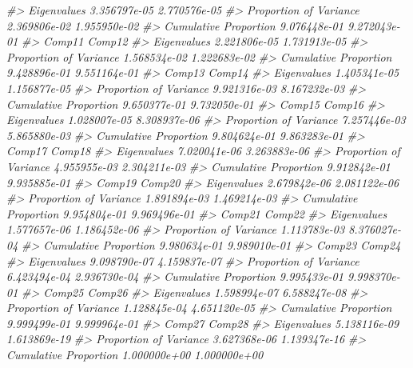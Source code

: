 \documentclass[
]{book}
\newenvironment{Shaded}{\begin{snugshade}}{\end{snugshade}}
\newcommand{\CommentTok}[1]{\textcolor[rgb]{0.56,0.35,0.01}{\textit{#1}}}
\begin{document}
\begin{Shaded}
\begin{Highlighting}[]
\CommentTok{\#\textgreater{} Eigenvalues            3.356797e{-}05 2.770576e{-}05}
\CommentTok{\#\textgreater{} Proportion of Variance 2.369806e{-}02 1.955950e{-}02}
\CommentTok{\#\textgreater{} Cumulative Proportion  9.076448e{-}01 9.272043e{-}01}
\CommentTok{\#\textgreater{}                              Comp11       Comp12}
\CommentTok{\#\textgreater{} Eigenvalues            2.221806e{-}05 1.731913e{-}05}
\CommentTok{\#\textgreater{} Proportion of Variance 1.568534e{-}02 1.222683e{-}02}
\CommentTok{\#\textgreater{} Cumulative Proportion  9.428896e{-}01 9.551164e{-}01}
\CommentTok{\#\textgreater{}                              Comp13       Comp14}
\CommentTok{\#\textgreater{} Eigenvalues            1.405341e{-}05 1.156877e{-}05}
\CommentTok{\#\textgreater{} Proportion of Variance 9.921316e{-}03 8.167232e{-}03}
\CommentTok{\#\textgreater{} Cumulative Proportion  9.650377e{-}01 9.732050e{-}01}
\CommentTok{\#\textgreater{}                              Comp15       Comp16}
\CommentTok{\#\textgreater{} Eigenvalues            1.028007e{-}05 8.308937e{-}06}
\CommentTok{\#\textgreater{} Proportion of Variance 7.257446e{-}03 5.865880e{-}03}
\CommentTok{\#\textgreater{} Cumulative Proportion  9.804624e{-}01 9.863283e{-}01}
\CommentTok{\#\textgreater{}                              Comp17       Comp18}
\CommentTok{\#\textgreater{} Eigenvalues            7.020041e{-}06 3.263883e{-}06}
\CommentTok{\#\textgreater{} Proportion of Variance 4.955955e{-}03 2.304211e{-}03}
\CommentTok{\#\textgreater{} Cumulative Proportion  9.912842e{-}01 9.935885e{-}01}
\CommentTok{\#\textgreater{}                              Comp19       Comp20}
\CommentTok{\#\textgreater{} Eigenvalues            2.679842e{-}06 2.081122e{-}06}
\CommentTok{\#\textgreater{} Proportion of Variance 1.891894e{-}03 1.469214e{-}03}
\CommentTok{\#\textgreater{} Cumulative Proportion  9.954804e{-}01 9.969496e{-}01}
\CommentTok{\#\textgreater{}                              Comp21       Comp22}
\CommentTok{\#\textgreater{} Eigenvalues            1.577657e{-}06 1.186452e{-}06}
\CommentTok{\#\textgreater{} Proportion of Variance 1.113783e{-}03 8.376027e{-}04}
\CommentTok{\#\textgreater{} Cumulative Proportion  9.980634e{-}01 9.989010e{-}01}
\CommentTok{\#\textgreater{}                              Comp23       Comp24}
\CommentTok{\#\textgreater{} Eigenvalues            9.098790e{-}07 4.159837e{-}07}
\CommentTok{\#\textgreater{} Proportion of Variance 6.423494e{-}04 2.936730e{-}04}
\CommentTok{\#\textgreater{} Cumulative Proportion  9.995433e{-}01 9.998370e{-}01}
\CommentTok{\#\textgreater{}                              Comp25       Comp26}
\CommentTok{\#\textgreater{} Eigenvalues            1.598994e{-}07 6.588247e{-}08}
\CommentTok{\#\textgreater{} Proportion of Variance 1.128845e{-}04 4.651120e{-}05}
\CommentTok{\#\textgreater{} Cumulative Proportion  9.999499e{-}01 9.999964e{-}01}
\CommentTok{\#\textgreater{}                              Comp27       Comp28}
\CommentTok{\#\textgreater{} Eigenvalues            5.138116e{-}09 1.613869e{-}19}
\CommentTok{\#\textgreater{} Proportion of Variance 3.627368e{-}06 1.139347e{-}16}
\CommentTok{\#\textgreater{} Cumulative Proportion  1.000000e+00 1.000000e+00}


\end{Highlighting}
\end{Shaded}
\end{document}
